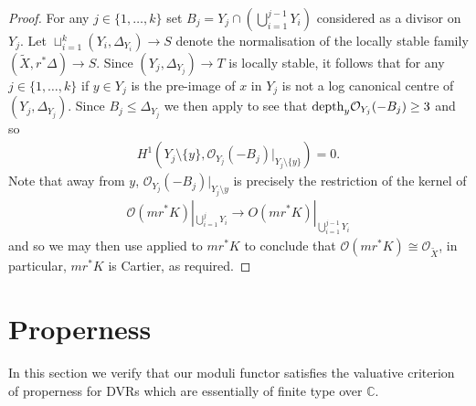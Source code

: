 \documentclass[12pt, a4paper]{amsart}
\newcounter{Theorem}
\theoremstyle{definition}
\theoremstyle{named}
\begin{document}
\begin{proof}
For any $j \in \{1, \dots, k\}$ set $B_j = Y_j \cap (\bigcup_{i =1}^{j-1}Y_i)$ considered as a divisor on $Y_j$.
Let $\sqcup_{i = 1}^k(Y_i, \Delta_{Y_i}) \to S$ denote the normalisation of the locally stable family $(\tilde{X}, r^*\Delta)\to S$.
Since $(Y_j, \Delta_{Y_j}) \rightarrow T$ is locally
stable, it follows that for any $j \in \{1, \dots, k\}$ if $y \in Y_j$ is the pre-image of $x$ in $Y_j$
is not a log canonical centre of $(Y_j, \Delta_{Y_j})$.
Since $B_j \leq \Delta_{Y_j}$ we then apply \cite[Theorem 7.20]{Kollar13}
to see that ${\rm depth}_y\mathcal O_{Y_j}(-B_j) \ge 3$ and so 
\begin{align*}H^1(Y_j \setminus \{y\}, \mathcal O_{Y_j}(-B_j)|_{Y_j \setminus \{y\}}) = 0.\end{align*}
Note that away from $y$, $\mathcal O_{Y_j}(-B_j)|_{Y_j\setminus y}$ is precisely the restriction of the kernel of \begin{align*}\mathcal O(mr^*K)|_{\bigcup_{i  = 1}^j Y_i} \to O(mr^*K)|_{\bigcup_{i  = 1}^{j-1}Y_i}\end{align*} and so we may then use \cite[Proposition 5.21.(3)]{Kollar13} applied to $mr^*K$ to conclude that $\mathcal O(mr^*K) \cong \mathcal O_{\tilde{X}}$, in particular, $mr^*K$
is Cartier, as required.
\end{proof}



\section{Properness}

In this section we verify that our moduli functor satisfies the valuative criterion of properness for DVRs which are essentially of finite type over $\mathbb C$.
\end{document}

